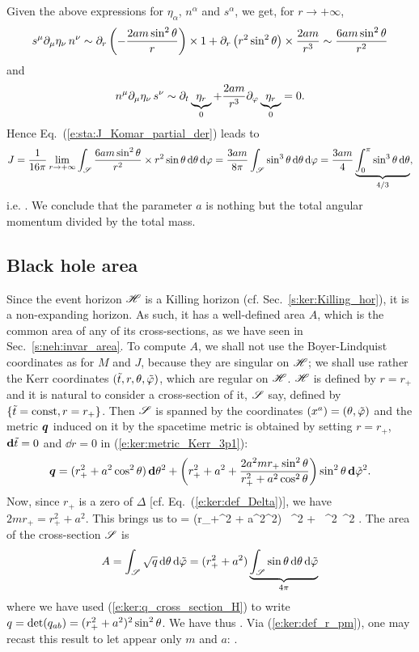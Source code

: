 Given the above expressions for $\eta_\alpha$, $n^\alpha$ and $s^\alpha$,
we get, for $r\rightarrow+\infty$,
\[
  s^\mu \partial_\mu \eta_\nu \, n^\nu \sim \partial_r \left( - \frac{2 a m \sin^2\theta}{r} \right) \times 1 + \partial_r \left(r^2 \sin^2\theta \right) \times \frac{2 a m}{r^3}
    \sim \frac{6 a m \sin^2\theta}{r^2}
\]
and
\[
    n^\mu \partial_\mu \eta_\nu \, s^\nu \sim \partial_t \underbrace{\eta_r}_{0}
        + \frac{2 a m}{r^3} \partial_\varphi \underbrace{\eta_r}_{0}  = 0 .
\]
Hence Eq.~(\ref{e:sta:J_Komar_partial_der}) leads to
\[
    J = \frac{1}{16\pi} \lim_{r\rightarrow +\infty}
        \int_{\mathscr{S}}
        \frac{6 a m \sin^2\theta}{r^2} \times
        r^2\sin\theta \, \mathrm{d}\theta\, \mathrm{d}\varphi  =
        \frac{3 a m}{8\pi} \int_{\mathscr{S}} \sin^3\theta \, \mathrm{d}\theta\, \mathrm{d}\varphi
        = \frac{3 a m}{4} \underbrace{\int_0^\pi \sin^3\theta \, \mathrm{d}\theta}_{4/3} ,
\]
i.e.
\be \label{e:ker:J_am}
     .
\ee
We conclude that the parameter $a$ is nothing but the total angular momentum
divided by the total mass.

\subsection{Black hole area}

Since the event horizon $\mathscr{H}$ is a Killing horizon (cf. Sec.~\ref{s:ker:Killing_hor}),
it is a non-expanding horizon. As such, it has a well-defined
area $A$, which is the
common area of any of its cross-sections, as we have seen in
Sec.~\ref{s:neh:invar_area}. To compute $A$, we shall not use the Boyer-Lindquist
coordinates as for $M$ and $J$, because they are singular on $\mathscr{H}$; we shall
use rather the Kerr coordinates $({\tilde t}, r, \theta,{\tilde\varphi})$, which are regular
on $\mathscr{H}$. $\mathscr{H}$ is defined by $r=r_+$ and it is natural to consider a
cross-section of it, $\mathscr{S}$ say, defined by $\{{\tilde t}=\mathrm{const}, r=r_+\}$.
Then $\mathscr{S}$ is spanned by the coordinates $(x^a) = (\theta,{\tilde\varphi})$ and the metric $\bm{q}$
induced on it by the spacetime metric is obtained by setting $r=r_+$,
$\mathbf{d}{\tilde t}=0$ and $\dd r = 0$ in (\ref{e:ker:metric_Kerr_3p1}):
\[
        \bm{q} =
   (r_+^2 + a^2\cos^2\theta)\, \mathbf{d} \theta^2
    + \left( r_+^2 + a^2 + \frac{2 a^2 m r_+ \sin^2\theta}{r_+^2 + a^2\cos^2\theta} \right)
    \sin^2\theta \, \mathbf{d} {\tilde\varphi}^2 .
\]
Now, since $r_+$ is a zero of $\Delta$ [cf. Eq.~(\ref{e:ker:def_Delta})],
we have $2 m r_+ = r_+^2 + a^2 $. This brings us to
\be \label{e:ker:q_cross_section_H}
         =
  (r_+^2 + a^2\cos^2\th) \, \dd \th^2
    + \,
    \sin^2\th \, \dd \tph^2 .
\ee
The area of the cross-section $\mathscr{S}$ is
\[
    A = \int_{\mathscr{S}} \sqrt{q} \, \mathrm{d}\theta\, \mathrm{d}{\tilde\varphi}
      = (r_+^2 + a^2) \underbrace{\int_{\mathscr{S}} \sin\theta \, \mathrm{d}\theta\, \mathrm{d}{\tilde\varphi}}_{4\pi}
\]
where we have used (\ref{e:ker:q_cross_section_H}) to write
$q = \det (q_{ab}) = (r_+^2 + a^2)^2 \sin^2\theta$.
We have thus
\be \label{e:ker:A_rp_a_m}
     .
\ee
Via (\ref{e:ker:def_r_pm}),
one may recast this result to let appear only $m$ and $a$:
\be \label{e:ker:A_a_m}
     .
\ee

